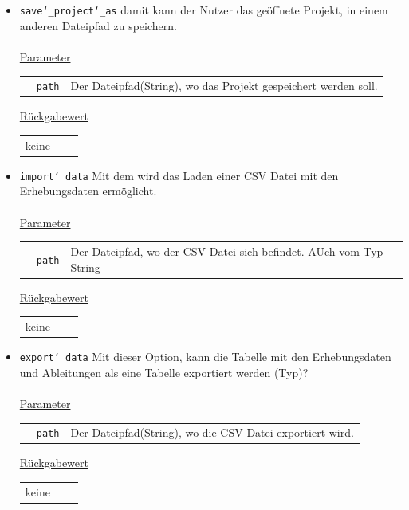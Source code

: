 \documentclass{article}
\begin{document}
\begin{itemize}
\item \texttt{save\char`_project\char`_as} \newline damit kann der Nutzer das geöffnete Projekt, in einem  anderen Dateipfad zu speichern.
\\\\
\underline{{Parameter}}
\begin{tabular}{lll}
 & \texttt{path} & Der Dateipfad(String), wo das Projekt gespeichert werden soll. \\
\end{tabular}

\underline{{Rückgabewert}}
\begin{tabular}{lll}
 keine \\
\end{tabular}

\item \texttt{import\char`_data} \newline Mit dem wird das Laden einer CSV Datei mit den Erhebungsdaten ermöglicht.
\\\\
\underline{{Parameter}}
\begin{tabular}{lll}
 & \texttt{path} & Der Dateipfad, wo der CSV Datei sich befindet. AUch vom Typ String \\
\end{tabular}

\underline{{Rückgabewert}}
\begin{tabular}{lll}
 keine \\
\end{tabular}

\item \texttt{export\char`_data} \newline Mit dieser Option, kann die Tabelle mit den Erhebungsdaten und Ableitungen als eine  Tabelle exportiert werden (Typ)?
\\\\
\underline{{Parameter}}
\begin{tabular}{lll}
 & \texttt{path} & Der Dateipfad(String), wo die CSV Datei exportiert wird. \\
\end{tabular}

\underline{{Rückgabewert}}
\begin{tabular}{lll}
 keine \\
\end{tabular}
\end{itemize}
\end{document}
